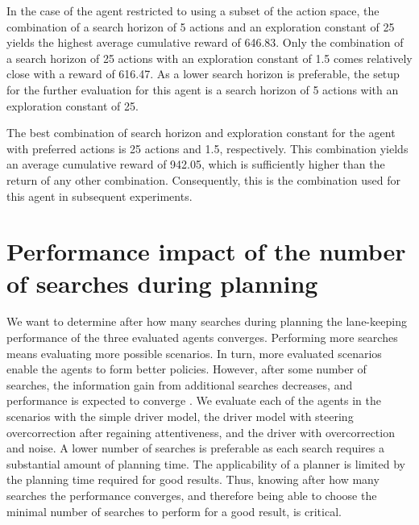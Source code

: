 In the case of the agent restricted to using a subset of the action space, the combination of a search horizon of 5 actions and an exploration constant of 25 yields the highest average cumulative reward of 646.83. Only the combination of a search horizon of 25 actions with an exploration constant of 1.5 comes relatively close with a reward of 616.47. As a lower search horizon is preferable, the setup for the further evaluation for this agent is a search horizon of 5 actions with an exploration constant of 25. 

The best combination of search horizon and exploration constant for the agent with preferred actions is 25 actions and 1.5, respectively. This combination yields an average cumulative reward of 942.05, which is sufficiently higher than the return of any other combination. Consequently, this is the combination used for this agent in subsequent experiments.

\section{Performance impact of the number of searches during planning}
\label{sec:convergence}





We want to determine after how many searches during planning the lane-keeping performance of the three evaluated agents converges. Performing more searches means evaluating more possible scenarios. In turn, more evaluated scenarios enable the agents to form better policies. However, after some number of searches, the information gain from additional searches decreases, and performance is expected to converge \parencite{pomcp}. We evaluate each of the agents in the scenarios with the simple driver model, the driver model with steering overcorrection after regaining attentiveness, and the driver with overcorrection and noise. A lower number of searches is preferable as each search requires a substantial amount of planning time. The applicability of a planner is limited by the planning time required for good results. Thus, knowing after how many searches the performance converges, and therefore being able to choose the minimal number of searches to perform for a good result, is critical. 


